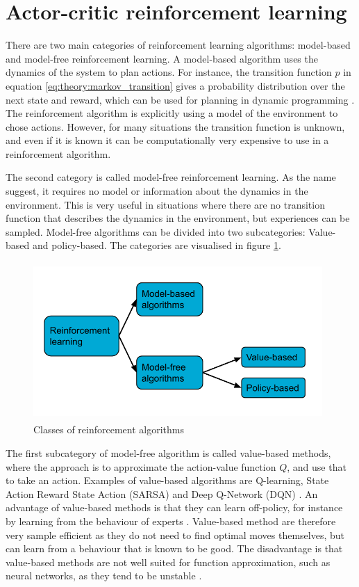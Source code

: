 \documentclass[class=book, crop=false, 11pt]{standalone}
\begin{document}
\section{Actor-critic reinforcement learning}
There are two main categories of reinforcement learning algorithms: model-based and model-free reinforcement learning. A model-based algorithm uses the dynamics of the system to plan actions. For instance, the transition function $p$ in equation \eqref{eq:theory:markov_transition}  gives a probability distribution over the next state and reward, which can be used for planning in dynamic programming \cite{silver_course}. The reinforcement algorithm is explicitly using a model of the environment to chose actions. However, for many situations the transition function is unknown, and even if it is known it can be computationally very expensive to use in a reinforcement algorithm.

The second category is called model-free reinforcement learning. As the name suggest, it requires no model or information about the dynamics in the environment. This is very useful in situations where there are no transition function that describes the dynamics in the environment, but experiences can be sampled. Model-free algorithms can be divided into two subcategories: Value-based and policy-based. The categories are visualised in figure \ref{fig:theory:rl_model_modelfree}.


\begin{figure}[ht!]
    \center
    \includegraphics[height=6cm, width=11cm]{figures/rl_model_modelfree.png}
    \caption  {Classes of reinforcement algorithms}
    \label{fig:theory:rl_model_modelfree}
\end{figure}


The first subcategory of model-free algorithm is called value-based methods, where the approach is to approximate the action-value function $Q$, and use that to take an action. Examples of value-based algorithms are Q-learning, State Action Reward State Action (SARSA) and Deep Q-Network (DQN) \cite{Sutton1998}. An advantage of value-based methods is that they can learn off-policy, for instance by learning from the behaviour of experts \cite{value_based_policy_Nachum}. Value-based method are therefore very sample efficient as they do not need to find optimal moves themselves, but can learn from a behaviour that is known to be good. The disadvantage is that value-based methods are not well suited for function approximation, such as neural networks, as they tend to be unstable \cite{Sutton1998}. 
\end{document}
